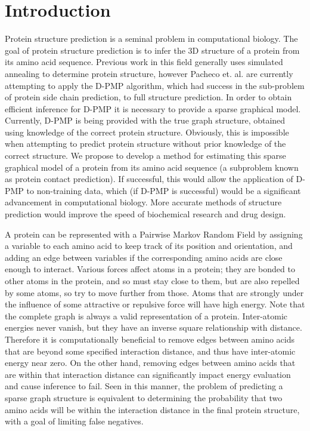 \documentclass{article}
\begin{document}
\section{Introduction}
Protein structure prediction is a seminal problem in computational biology. The goal of protein structure prediction is to infer the 3D structure of a protein from its amino acid sequence. Previous work in this field generally uses simulated annealing to determine protein structure, however Pacheco et. al. are currently attempting to apply the D-PMP algorithm, which had success in the sub-problem of protein side chain prediction, to full structure prediction. In order to obtain efficient inference for D-PMP it is necessary to provide a sparse graphical model. Currently, D-PMP is being provided with the true graph structure, obtained using knowledge of the correct protein structure. Obviously, this is impossible when attempting to predict protein structure without prior knowledge of the correct structure. We propose to develop a method for estimating this sparse graphical model of a protein from its amino acid sequence (a subproblem known as protein contact prediction). If successful, this would allow the application of D-PMP to non-training data, which (if D-PMP is successful) would be a significant advancement in computational biology. More accurate methods of structure prediction would improve the speed of biochemical research and drug design.

A protein can be represented with a Pairwise Markov Random Field by assigning a variable to each amino acid to keep track of its position and orientation, and adding an edge between variables if the corresponding amino acids are close enough to interact. Various forces affect atoms in a protein; they are bonded to other atoms in the protein, and so must stay close to them, but are also repelled by some atoms, so try to move further from those. Atoms that are strongly under the influence of some attractive or repulsive force will have high energy. Note that the complete graph is always a valid representation of a protein. Inter-atomic energies never vanish, but they have an inverse square relationship with distance. Therefore it is computationally beneficial to remove edges between amino acids that are beyond some specified interaction distance, and thus have inter-atomic energy near zero. On the other hand, removing edges between amino acids that are within that interaction distance can significantly impact energy evaluation and cause inference to fail. Seen in this manner, the problem of predicting a sparse graph structure is equivalent to determining the probability that two amino acids will be within the interaction distance in the final protein structure, with a goal of limiting false negatives.
\end{document}
